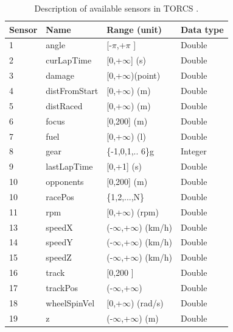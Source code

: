 \documentclass[runningheads,a4paper]{llncs}
\begin{document}
	\begin{table}[ht!]
		{\scriptsize
			{\centering
				\begin{tabular}{|p{2cm}|p{3cm}|p{3 cm}|p{3 cm}|}
					\hline
					{\textbf{Sensor} }&
					{\textbf{Name} }&
					{\textbf{Range} (unit)} &  
					{\textbf{Data type}}\\ 
					\hline
					1 & angle & [-$\pi$,+$\pi$ ] & Double\\ 
					\hline
					2 & curLapTime & [0,+$\infty$] (s)	& Double\\ 
					\hline 
					3 & damage & [0,+$\infty$)(point)& Double\\ 
					\hline 
					4 & distFromStart & [0,+$\infty$) (m)& Double \\ 
					\hline 
					5 & distRaced &[0,+$\infty$) (m)& Double\\
					\hline 
					
					6 & focus & [0,200] (m)& Double\\
					\hline 
					
					7 & fuel & [0,+$\infty$) (l)& Double\\
					
					\hline
					8 & gear & \{-1,0,1,.. 6\}g& Integer \\
					
					\hline
					9 & lastLapTime &[0,+1] (s) & Double \\
					
					\hline
					10 & opponents &[0,200] (m)& Double \\
					
					\hline
					10 & racePos & \{1,2,...,N\} & Double \\
					\hline
					11 & rpm    & [0,+$\infty$) (rpm)   & Double \\
					\hline  
					13 & speedX & (-$\infty$,+$\infty$) (km/h) & Double\\
					\hline  
					14 & speedY &(-$\infty$,+$\infty$) (km/h)  & Double\\
					\hline 
					15 & speedZ & (-$\infty$,+$\infty$) (km/h) & Double \\
					
					\hline
					16 & track &  [0,200 ] & Double\\ 
					\hline
					17 & trackPos & (-$\infty$,+$\infty$) & Double\\
					
					\hline
					
					18 & wheelSpinVel  & [0,+$\infty$) (rad/s) & Double\\
					
					\hline
					19 & z &  (-$\infty$,+$\infty$) (m) & Double\\
					
					\hline
					
				\end{tabular}
			}
		}
		\caption{Description of available sensors in TORCS \cite{Torcs3}.}
		\label{t1}
	\end{table}
	
\end{document}
